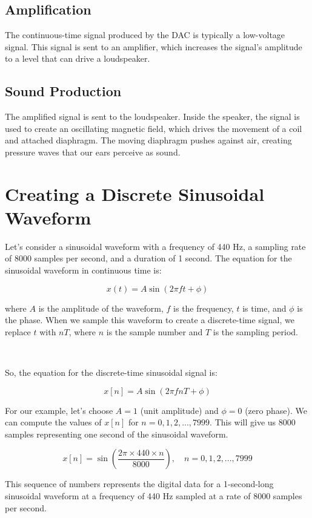 \documentclass[11pt]{article}
\begin{document}
\subsection*{Amplification}

The continuous-time signal produced by the DAC is typically a low-voltage signal. This signal is sent to an amplifier, which increases the signal's amplitude to a level that can drive a loudspeaker.

\subsection*{Sound Production}

The amplified signal is sent to the loudspeaker. Inside the speaker, the signal is used to create an oscillating magnetic field, which drives the movement of a coil and attached diaphragm. The moving diaphragm pushes against air, creating pressure waves that our ears perceive as sound.


\section*{Creating a Discrete Sinusoidal Waveform}

Let's consider a sinusoidal waveform with a frequency of 440 Hz, a sampling rate of 8000 samples per second, and a duration of 1 second. The equation for the sinusoidal waveform in continuous time is:

\[
x(t) = A\sin(2\pi f t + \phi)
\]

where $A$ is the amplitude of the waveform, $f$ is the frequency, $t$ is time, and $\phi$ is the phase. When we sample this waveform to create a discrete-time signal, we replace $t$ with $nT$, where $n$ is the sample number and $T$ is the sampling period.

\ 


So, the equation for the discrete-time sinusoidal signal is:

\[
x[n] = A\sin(2\pi f nT + \phi)
\]

For our example, let's choose $A = 1$ (unit amplitude) and $\phi = 0$ (zero phase). We can compute the values of $x[n]$ for $n = 0, 1, 2, ..., 7999$. This will give us 8000 samples representing one second of the sinusoidal waveform.

\[
x[n] = \sin\left(\frac{2\pi \times 440 \times n}{8000}\right), \quad n = 0, 1, 2, ..., 7999
\]

This sequence of numbers represents the digital data for a 1-second-long sinusoidal waveform at a frequency of 440 Hz sampled at a rate of 8000 samples per second.
\end{document}
